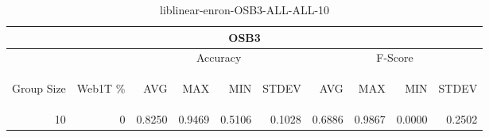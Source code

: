 \begin{center}
\begin{table}[htbp] 
 \begin{center}
\begin{tabular}{ | r | r | r | r | r | r | r | r | r | r |}
\hline
\multicolumn{10}{|c|}{OSB3}\\
\hline
 & & \multicolumn{4}{|c|}{Accuracy} & \multicolumn{4}{|c|}{F-Score}\\ \cline{3-10}
\begin{sideways}Group Size\end{sideways} & \begin{sideways}Web1T \%\end{sideways} & \begin{sideways}AVG\end{sideways} & \begin{sideways}MAX\end{sideways} & \begin{sideways}MIN\end{sideways} & \begin{sideways}STDEV\end{sideways} & \begin{sideways}AVG\end{sideways} & \begin{sideways}MAX\end{sideways} & \begin{sideways}MIN\end{sideways} & \begin{sideways}STDEV\end{sideways}\\
\hline
\multirow{0}{*}{10}
 & 0 & 0.8250 & 0.9469 & 0.5106 & 0.1028 & 0.6886 & 0.9867 & 0.0000 & 0.2502\\ \cline{2-10}
\hline
\end{tabular}
\caption{liblinear-enron-OSB3-ALL-ALL-10}
\label{table:liblinear-enron-OSB3-ALL-ALL-10}
\end{center}
 \end{table}
\end{center}

